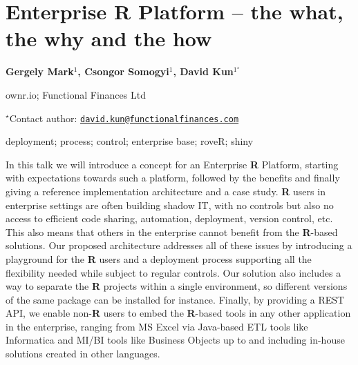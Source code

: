 \documentclass[\main/boa.tex]{subfiles}
\begin{document}
\section{Enterprise R Platform -- the what, the why and the how}

\begin{center}
  {\bf {} Gergely Mark$^{1}$,  Csongor Somogyi$^{1}$,  David Kun$^{1^\star}$}
\end{center}

\vskip 0.3cm

\begin{affiliations}
\begin{enumerate}
\begin{minipage}{0.915\textwidth}
\centering
\item ownr.io; Functional Finances Ltd \\[-2pt]
\end{minipage}
\end{enumerate}
$^\star$Contact author: \href{mailto:david.kun@functionalfinances.com}{\nolinkurl{david.kun@functionalfinances.com}}\\
\end{affiliations}

\vskip 0.5cm

\begin{minipage}{0.915\textwidth}
\keywords deployment; process; control; enterprise
\packages {} base;  roveR;  shiny
\end{minipage}

\vskip 0.8cm

In this talk we will introduce a concept for an Enterprise \textbf{R}
Platform, starting with expectations towards such a platform, followed
by the benefits and finally giving a reference implementation
architecture and a case study. \textbf{R} users in enterprise settings
are often building shadow IT, with no controls but also no access to
efficient code sharing, automation, deployment, version control, etc.
This also means that others in the enterprise cannot benefit from the
\textbf{R}-based solutions. Our proposed architecture addresses all of
these issues by introducing a playground for the \textbf{R} users and a
deployment process supporting all the flexibility needed while subject
to regular controls. Our solution also includes a way to separate the
\textbf{R} projects within a single environment, so different versions
of the same package can be installed for instance. Finally, by providing
a REST API, we enable non-\textbf{R} users to embed the \textbf{R}-based
tools in any other application in the enterprise, ranging from MS Excel
via Java-based ETL tools like Informatica and MI/BI tools like Business
Objects up to and including in-house solutions created in other
languages.
\end{document}
